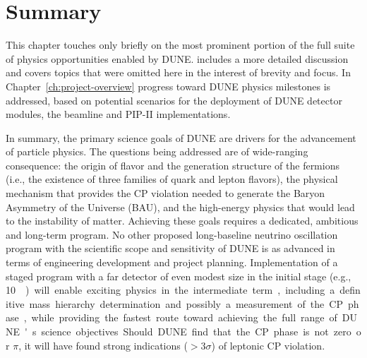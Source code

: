 
%
\section{Summary}


This chapter %
touches only briefly on the most prominent portion of
the full suite of physics opportunities enabled by DUNE.  
\volphys includes a more detailed discussion and covers topics %
that were omitted here in the interest of brevity and focus.  In
Chapter~\ref{ch:project-overview} progress toward DUNE physics milestones is
addressed, based on potential scenarios for the deployment of DUNE
detector modules, the beamline and PIP-II implementations. 

In summary, the primary science goals of DUNE are drivers for the
advancement of particle physics. The questions being addressed are of
wide-ranging consequence: the origin of flavor and the generation
structure of the fermions (i.e., the existence of three families of
quark and lepton flavors), the physical mechanism that provides the CP
violation needed to generate the Baryon Asymmetry of the Universe
(BAU), and the high-energy physics that would lead to the instability
of matter.  Achieving these goals requires a dedicated, ambitious and
long-term program.  No other proposed long-baseline neutrino
oscillation program with the scientific scope and sensitivity of DUNE
is as advanced in terms of engineering development and project
planning.  Implementation of a staged program with a far detector of
even modest size in the initial stage (e.g., \SI{10}\kt) will enable
exciting physics in the intermediate term, including a definitive mass
hierarchy determination and possibly a measurement of the CP phase, 
while providing the fastest route toward achieving the
full range of DUNE's science objectives.  Should DUNE find that the CP
phase is not zero or $\pi$, it will have found strong indications
($>3\sigma$) of leptonic CP violation.


